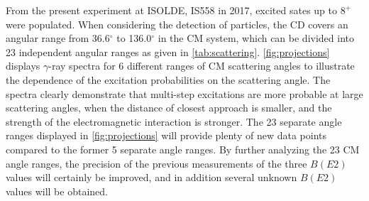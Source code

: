 \documentclass[twoside,english]{uiofysmaster/uiofysmaster}
\newcommand{\ga}{$\gamma$}
\let\orgautoref\autoref
\renewcommand{\autoref}
        {%
		 \def\sectionautorefname{Section}%
		 \def\subsectionautorefname{Section}%
		 \def\subsubsectionautorefname{Section}%
		 \def\chapterautorefname{Chapter}%
          \orgautoref}
\begin{document}
From the present experiment at ISOLDE, IS558 in 2017, excited sates up to $8^+$ were populated. 
When considering the detection of particles, the CD covers an angular range from 36.6$^\circ$ to 136.0$^\circ$ in the CM system, which can be divided into 23 independent angular ranges as given in \autoref{tab:scattering}. 
\autoref{fig:projections} displays \ga-ray spectra for 6 different ranges of CM scattering angles to illustrate the dependence of the excitation probabilities on the scattering angle. 
The spectra clearly demonstrate that multi-step excitations are more probable at large scattering angles, when the distance of closest approach is smaller, and the strength of the electromagnetic interaction is stronger. 
The 23 separate angle ranges displayed in \autoref{fig:projections} will provide plenty of new data points compared to the former 5 separate angle ranges.
By further analyzing the 23 CM angle ranges, the precision of the previous measurements of the three $B(E2)$ values will certainly be improved, and in addition several unknown $B(E2)$ values will be obtained.
\end{document}
